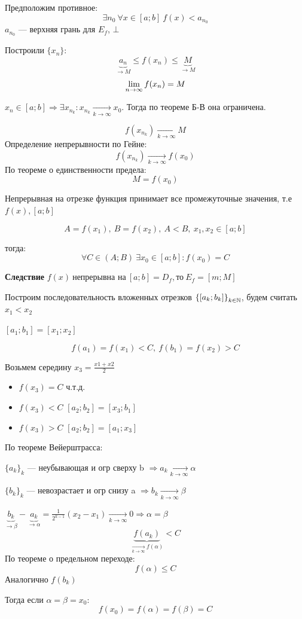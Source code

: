 \begin{Proof}[]
Предположим противное:
\[
    \exists n_0\ \forall x \in [a;b]\ f(x) < a_{n_0}
\]
$a_{n_0}$ --- верхняя грань для $E_f$, $\bot$

Построили $\{x_n\}$: 
\[
    \underbrace{a_n}_{\to M} \leq f(x_n) \leq \underbrace{M}_{\to M}
\]
\[
    \lim\limits_{n \to \infty} f(x_n) = M
\]

$x_n \in [a;b] \Rightarrow \exists x_{n_k} : x_{n_k} \underset{k \to \infty}{\rightarrow} x_0$. Тогда по теореме Б-В она ограничена.

\[
    f(x_{n_k}) \xrightarrow[k \to \infty ]{} M
\]
Определение непрерывности по Гейне:
\[
    f(x_{n_k}) \xrightarrow[k \to \infty ]{} f(x_0)
\]
По теореме о единственности предела:
\[
    M = f(x_0)
\]
\end{Proof}

\begin{theorem}
    Непрерывная на отрезке функция принимает все промежуточные значения, т.е $f(x), [a;b]$

    $$A = f(x_1),\ B = f(x_2),\ A < B,\ x_1, x_2 \in [a;b]$$

    тогда:
    $$\forall C \in (A;B)\ \exists x_0 \in [a;b] : f(x_0) = C$$
\end{theorem}

{\bf Следствие} $f(x)\ \text{непрерывна на}\ [a;b] = D_f, \text{то}\ E_f = [m; M]$

\begin{Proof}
Построим последовательность вложенных отрезков $\left\{[a_k; b_k] \right\}_{k \in \mathbb{N}}$, будем считать $x_1 < x_2$

$[a_1; b_1] = [x_1; x_2]$

\[
    f(a_1) = f(x_1) < C,\ f(b_1) = f(x_2) > C
\]

Возьмем середину $x_3 = \frac{x1 + x2}{2}$

\begin{itemize}
    \item[1.] $f(x_3) = C$ ч.т.д.
    \item[2.] $f(x_3) < C$ $[a_2; b_2] = [x_3; b_1]$
    \item[3.] $f(x_3) > C$ $[a_2; b_2] = [a_1; x_3]$
\end{itemize}

По теореме Вейерштрасса:

$\{a_k\}_k$ --- неубывающая и огр сверху b $\Rightarrow a_k \xrightarrow[k \to \infty ]{} \alpha $

$\{b_k\}_k$ --- невозрастает и огр снизу a $\Rightarrow b_k \xrightarrow[k \to \infty ]{} \beta $

$\underbrace{b_k}_{\to \beta } - \underbrace{a_k}_{\to \alpha } = \frac{1}{2^{k - 1}} (x_2 - x_1) \underset{k \to \infty}{\to} 0 \Rightarrow \alpha = \beta $
\[
    \underbrace{f(a_k)}_{\xrightarrow[k \to \infty ]{} f(\alpha) } < C
\]
По теореме о предельном переходе:
\[
    f(\alpha) \leq C
\]
Аналогично $f(b_k)$

Тогда если $\alpha = \beta = x_0$:
\[
    f(x_0) = f(\alpha) = f(\beta) = C
\]
\end{Proof}

